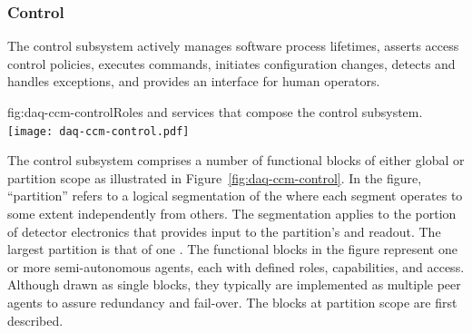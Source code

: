\subsubsection{Control}
\label{sec:daq:design:ccm:control}


The  control subsystem actively manages  software process lifetimes, asserts access control policies, executes commands, initiates configuration changes, detects and handles exceptions, and provides an interface for human operators.


\begin{dunefigure}{fig:daq-ccm-control}{Roles and services that compose the  control subsystem.}
  \texttt{[image: daq-ccm-control.pdf]}
\end{dunefigure}

The control subsystem comprises a number of functional blocks of either global or partition scope as illustrated in Figure~\ref{fig:daq-ccm-control}. 
In the figure, ``partition'' refers to a logical segmentation of the  where each segment operates to some extent independently from others. 
The segmentation applies to the portion of detector electronics that provides input to the partition's  and readout. 
The largest partition %
is that of one . 
The functional blocks in the figure represent one or more semi-autonomous agents, each with defined roles, capabilities, and access. 
Although drawn as single blocks, they typically are implemented as multiple peer agents to assure redundancy and fail-over. 
The blocks at partition scope are first described.

